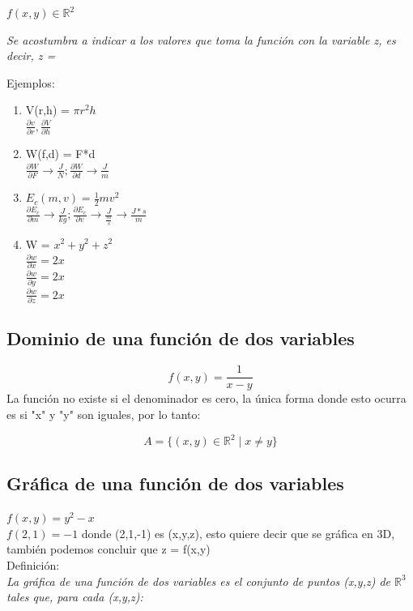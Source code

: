 \documentclass[letterpaper,12pt]{article}
\begin{document}
\begin{sloppypar}
\begin{center}
    $f(x,y) \in \mathbb{R}^2$ 

    \textit{Se acostumbra a indicar a los valores que toma la función con la variable z, es decir, z = }
\end{center}

Ejemplos:
\begin{enumerate}
    \item V(r,h) = $\pi r^2h$
        \vspace{0.3cm}\\
         $\displaystyle \frac{\partial v}{\partial r} , \frac{\partial V}{\partial h}$
    \item W(f,d) = F*d 
        \vspace{0.3cm}\\
        $\displaystyle \frac{\partial W}{\partial F} \longrightarrow\frac{J}{N}; \frac{\partial W}{\partial d} \longrightarrow \frac{J}{m}$
    \item $E_c(m,v) = \displaystyle \frac{1}{2} mv^{2}$
        \vspace{0.3cm}\\
        $\displaystyle \frac{\partial E_c}{\partial m} \longrightarrow \frac{J}{kg}; \frac{\partial E_c}{\partial v} \longrightarrow \frac{J}{\frac{m}{s}} \longrightarrow \frac{J*s}{m}$
    \item W = $x^2 + y^2 + z^2 $
        \vspace{0.3cm}\\ 
        $\displaystyle \frac{\partial w}{ \partial x} = 2x$
        \vspace{0.3cm}\\ 
        $\displaystyle \frac{\partial w}{ \partial y} = 2x$
        \vspace{0.3cm}\\ 
        $\displaystyle \frac{\partial w}{ \partial z} = 2x$
\end{enumerate}

\subsection{Dominio de una función de dos variables}
$$f(x,y) = \frac{1}{x - y}$$
La función no existe si el denominador es cero, la única forma donde esto ocurra es si "x" y "y" son iguales, por lo tanto: 

$$A = \{(x,y)\in \mathbb{R}^{2} \mid x \neq y \} $$

\subsection{Gráfica de una función de dos variables}
$f(x,y) = y^2 - x$
\vspace{0.3cm}\\
$f(2,1) = -1$ donde (2,1,-1) es (x,y,z), esto quiere decir que se gráfica en 3D, también podemos concluir que z = f(x,y)
\vspace{0.3cm}\\
\textcolor[rgb]{0.3,0.6,0.7}{Definición:}
\vspace{0.3cm}\\
\textit{La gráfica de una función de dos variables es el conjunto de puntos (x,y,z) de $\mathbb{R}^3$ tales que, para cada (x,y,z):}


\end{sloppypar}
\end{document}
